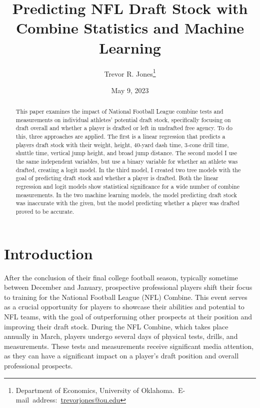 \documentclass[12pt,english]{article}
\begin{document}
\begin{singlespace}
\title{Predicting NFL Draft Stock with Combine Statistics and Machine Learning}
\end{singlespace}


\author{Trevor R. Jones\thanks{Department of Economics, University of Oklahoma.\
E-mail~address:~\href{mailto:trevorjones@ou.edu}{trevorjones@ou.edu}}}

\date{May 9, 2023}

\maketitle

\begin{abstract}
\begin{singlespace}
This paper examines the impact of National Football League combine tests and measurements on individual athletes' potential draft stock, specifically focusing on draft overall and whether a player is drafted or left in undrafted free agency. To do this, three approaches are applied. The first is a linear regression that predicts a players draft stock with their weight, height, 40-yard dash time, 3-cone drill time, shuttle time, vertical jump height, and broad jump distance. The second model I use the same independent variables, but use a binary variable for whether an athlete was drafted, creating a logit model. In the third model, I created two tree models with the goal of predicting draft stock and whether a player is drafted. Both the linear regression and logit models show statistical significance for a wide number of combine measurements. In the two machine learning models, the model predicting draft stock was inaccurate with the given, but the model predicting whether a player was drafted proved to be accurate. 
\end{singlespace}

\end{abstract}
\vfill{}


\pagebreak{}


\section{Introduction}\label{sec:intro}
After the conclusion of their final college football season, typically sometime between December and January, prospective professional players shift their focus to training for the National Football League (NFL) Combine. This event serves as a crucial opportunity for players to showcase their abilities and potential to NFL teams, with the goal of outperforming other prospects at their position and improving their draft stock. During the NFL Combine, which takes place annually in March, players undergo several days of physical tests, drills, and measurements. These tests and measurements receive significant media attention, as they can have a significant impact on a player's draft position and overall professional prospects.
\end{document}
